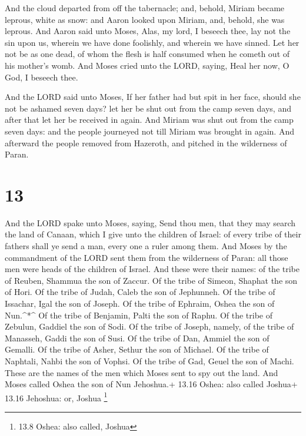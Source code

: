  And the cloud departed from off the tabernacle; and,
behold, Miriam became leprous, white as snow: and Aaron looked upon
Miriam, and, behold, she was leprous.  And Aaron said unto
Moses, Alas, my lord, I beseech thee, lay not the sin upon us, wherein
we have done foolishly, and wherein we have sinned.  Let
her not be as one dead, of whom the flesh is half consumed when he
cometh out of his mother's womb.  And Moses cried unto the
LORD, saying, Heal her now, O God, I beseech thee.

 And the LORD said unto Moses, If her father had but spit
in her face, should she not be ashamed seven days? let her be shut out
from the camp seven days, and after that let her be received in again.
 And Miriam was shut out from the camp seven days: and the
people journeyed not till Miriam was brought in again.  And
afterward the people removed from Hazeroth, and pitched in the
wilderness of Paran.

\hypertarget{section-12}{%
\section{13}\label{section-12}}

 And the LORD spake unto Moses, saying,  Send
thou men, that they may search the land of Canaan, which I give unto the
children of Israel: of every tribe of their fathers shall ye send a man,
every one a ruler among them.  And Moses by the commandment
of the LORD sent them from the wilderness of Paran: all those men were
heads of the children of Israel.  And these were their
names: of the tribe of Reuben, Shammua the son of Zaccur. 
Of the tribe of Simeon, Shaphat the son of Hori.  Of the
tribe of Judah, Caleb the son of Jephunneh.  Of the tribe of
Issachar, Igal the son of Joseph.  Of the tribe of Ephraim,
Oshea the son of Nun.\^{}*\^{}  Of the tribe of Benjamin,
Palti the son of Raphu.  Of the tribe of Zebulun, Gaddiel
the son of Sodi.  Of the tribe of Joseph, namely, of the
tribe of Manasseh, Gaddi the son of Susi.  Of the tribe of
Dan, Ammiel the son of Gemalli.  Of the tribe of Asher,
Sethur the son of Michael.  Of the tribe of Naphtali, Nahbi
the son of Vophsi.  Of the tribe of Gad, Geuel the son of
Machi.  These are the names of the men which Moses sent to
spy out the land. And Moses called Oshea the son of Nun Jehoshua.+ 13.16
Oshea: also called Joshua+ 13.16 Jehoshua: or, Joshua \footnote{13.8
  Oshea: also called, Joshua}

